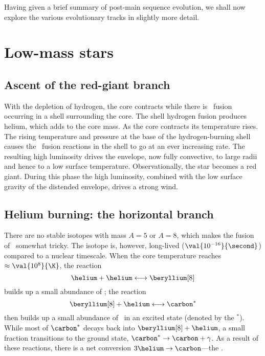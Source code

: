 Having given a brief summary of post-main sequence evolution, we shall now explore the various evolutionary tracks in slightly more detail.

\section{Low-mass stars}

\subsection{Ascent of the red-giant branch}

With the depletion of hydrogen, the core contracts while there is \hydrogen\ fusion occurring in a shell surrounding the core. The shell hydrogen fusion produces helium, which adds to the core mass. As the core contracts its temperature rises. The rising temperature and pressure at the base of the hydrogen-burning shell causes the \hydrogen\ fusion reactions in the shell to go at an ever increasing rate. The resulting high luminosity drives the envelope, now fully convective, to large radii and hence to a low surface temperature. Observationally, the star becomes a red giant.  During this phase the high luminosity, combined with the low surface gravity of the distended envelope, drives a strong wind.

\subsection{Helium burning: the horizontal branch}
There are no stable isotopes with mass $A=5$ or $A=8$, which makes the fusion of \helium\ somewhat tricky.  The isotope \beryllium[8] is, however, long-lived ($\val{10^{-16}}{\second}$) compared to a nuclear timescale.
When the core temperature reaches $\approx\val{10^{8}}{\K}$, the reaction
\[ \helium + \helium \longleftrightarrow\beryllium[8] \]
builds up a small abundance of \beryllium[8]; the reaction
\[ \beryllium[8] + \helium \longleftrightarrow \carbon^{*} \]
then builds up a small abundance of \carbon\ in an excited state (denoted by the $^{*}$).  While most of $\carbon^{*}$ decays back into $\beryllium[8]+\helium$, a small fraction transitions to the ground state, $\carbon^{*}\to\carbon+\gamma$. As a result of these reactions, there is a net conversion $3\helium\to\carbon$---the .


